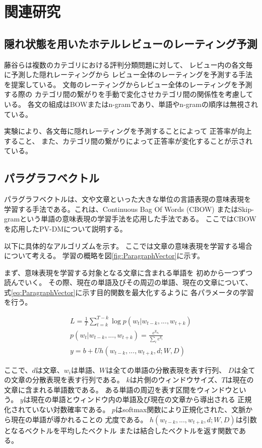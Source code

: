 \documentclass[twocolumn,a4paper]{ltjarticle}
\begin{document}
\section{関連研究}

\subsection{隠れ状態を用いたホテルレビューのレーティング予測}

藤谷ら\cite{fujitani15}は複数のカテゴリにおける評判分類問題に対して、
レビュー内の各文毎に予測した隠れレーティングから
レビュー全体のレーティングを予測する手法を提案している。
文毎のレーティングからレビュー全体のレーティングを予測する際の
カテゴリ間の繋がりを手動で変化させカテゴリ間の関係性を考慮している。
各文の組成はBOWまたはn-gramであり、単語やn-gramの順序は無視されている。

実験により、各文毎に隠れレーティングを予測することによって
正答率が向上すること、
また、カテゴリ間の繋がりによって正答率が変化することが示されている。


\subsection{パラグラフベクトル}

パラグラフベクトルは、文や文章といった大きな単位の言語表現の意味表現を
学習する手法である。これは、Continuous Bag Of Words (CBOW)
またはSkip-gramという単語の意味表現の学習手法を応用した手法である。
ここではCBOWを応用したPV-DMについて説明する。

以下に具体的なアルゴリズムを示す。
ここでは文章の意味表現を学習する場合について考える。
学習の概略を図\ref{fig:ParagraphVector}に示す。

まず、意味表現を学習する対象となる文章に含まれる単語を
初めから一つずつ読んでいく。
その際、現在の単語及びその周辺の単語、現在の文章について、
式\ref{eq:ParagraphVector}に示す目的関数を最大化するように
各パラメータの学習を行う。

\begin{gather}
  L = \frac{1}{T} \sum^{T - k}_{t = k} \log p(w_t | w_{t-k}, ..., w_{t+k})
  \label{eq:ParagraphVector} \\
  p(w_t | w_{t-k}, ..., w_{t+k}) = \frac{e^{y_{w_t}}}{\sum_i e^{y_i}} \\
  y = b + Uh(w_{t-k}, ..., w_{t+k}, d; W, D)
\end{gather}

ここで、$d$は文章、$w_i$は単語、$W$は全ての単語の分散表現を表す行列、
$D$は全ての文章の分散表現を表す行列である。
$k$は片側のウィンドウサイズ、$T$は現在の文章に含まれる単語数である。
ある単語の周辺を表す区間をウィンドウという。
$y$は現在の単語とウィンドウ内の単語及び現在の文章から導出される
正規化されていない対数確率である。
$p$はsoftmax関数により正規化された、文脈から現在の単語が導かれることの
尤度である。
$h(w_{t-k}, ..., w_{t+k}, d; W, D)$は引数となるベクトルを平均したベクトル
または結合したベクトルを返す関数である。
\end{document}

